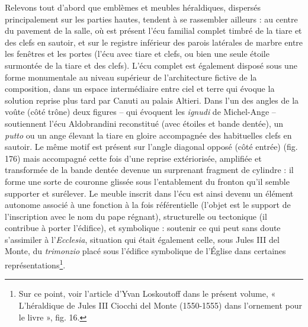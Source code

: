 \documentclass[12pt,twoside,openany]{book}
\begin{document}
Relevons tout d’abord que emblèmes et meubles héraldiques, dispersés principalement sur les parties hautes, tendent à se rassembler ailleurs : au centre du pavement de la salle, où est présent l’écu familial complet timbré de la tiare et des clefs en sautoir, et sur le registre inférieur des parois latérales de marbre entre les fenêtres et les portes (l’écu avec tiare et clefs, ou bien une seule étoile surmontée de la tiare et des clefs). L’écu complet est également disposé sous une forme monumentale au niveau supérieur de l’architecture fictive de la composition, dans un espace intermédiaire entre ciel et terre qui évoque la solution reprise plus tard par Canuti au palais Altieri. Dans l’un des angles de la voûte (côté trône) deux figures – qui évoquent les \textit{ignudi} de Michel-Ange – soutiennent l’écu Aldobrandini reconstitué (avec étoiles et bande dentée), un \textit{putto} ou un ange élevant la tiare en gloire accompagnée des habituelles clefs en sautoir. Le même motif est présent sur l’angle diagonal opposé (côté entrée) (fig. 176) mais accompagné cette fois d’une reprise extériorisée, amplifiée et transformée de la bande dentée devenue un surprenant fragment de cylindre : il forme une sorte de couronne glissée sous l’entablement du fronton qu’il semble supporter et surélever. Le meuble inscrit dans l’écu est ainsi devenu un élément autonome associé à une fonction à la fois référentielle (l’objet est le support de l’inscription avec le nom du pape régnant), structurelle ou tectonique (il contribue à porter l’édifice), et symbolique : soutenir ce qui peut sans doute s’assimiler à l’\textit{Ecclesia}, situation qui était également celle, sous Jules III del Monte, du \textit{trimonzio} placé sous l’édifice symbolique de l’Église dans certaines représentations\footnote{Sur ce point, voir l’article d’Yvan Loskoutoff dans le présent volume, « L’héraldique de Jules III Ciocchi del Monte (1550-1555) dans l’ornement pour le livre », fig. 16.}.
\end{document}
